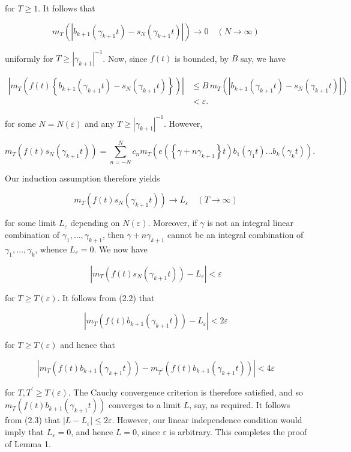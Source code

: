 \documentclass[10pt]{article}
\begin{document}
for $T \geq 1$. It follows that

$$
m_{T}\left(\left|b_{k+1}\left(\gamma_{k+1} t\right)-s_{N}\left(\gamma_{k+1} t\right)\right|\right) \rightarrow 0 \quad(N \rightarrow \infty)
$$

uniformly for $T \geq |\gamma_{k+1}|^{-1}$. Now, since $f(t)$ is bounded, by $B$ say, we have


\begin{align*}
\left|m_{T}\left(f(t)\left\{b_{k+1}\left(\gamma_{k+1}t\right)-s_{N}\left(\gamma_{k+1}t\right)\right\}\right)\right|
&\leq B\,m_{T}\left(\left|b_{k+1}\left(\gamma_{k+1}t\right)-s_{N}\left(\gamma_{k+1}t\right)\right|\right) \\
&<\varepsilon. \tag{2.2}
\end{align*}


for some $N=N(\varepsilon)$ and any $T \geq |\gamma_{k+1}|^{-1}$. However,

$$
m_{T}\left(f(t) s_{N}\left(\gamma_{k+1} t\right)\right)=\sum_{n=-N}^{N} c_{n} m_{T}\left(e\left(\left\{\gamma+n \gamma_{k+1}\right\} t\right) b_{1}\left(\gamma_{1} t\right) \ldots b_{k}\left(\gamma_{k} t\right)\right) .
$$

Our induction assumption therefore yields

$$
m_{T}\left(f(t) s_{N}\left(\gamma_{k+1} t\right)\right) \rightarrow L_{\varepsilon} \quad(T \rightarrow \infty)
$$

for some limit $L_{\varepsilon}$ depending on $N(\varepsilon)$. Moreover, if $\gamma$ is not an integral linear combination of $\gamma_{1}, \ldots, \gamma_{k+1}$, then $\gamma+n \gamma_{k+1}$ cannot be an integral combination of $\gamma_{1}, \ldots, \gamma_{k}$, whence $L_{\varepsilon}=0$. We now have

$$
\left|m_{T}\left(f(t) s_{N}\left(\gamma_{k+1} t\right)\right)-L_{\varepsilon}\right|<\varepsilon
$$

for $T \geq T(\varepsilon)$. It follows from (2.2) that


\begin{equation*}
\left|m_{T}\left(f(t) b_{k+1}\left(\gamma_{k+1} t\right)\right)-L_{\varepsilon}\right|<2 \varepsilon \tag{2.3}
\end{equation*}


for $T \geq T(\varepsilon)$ and hence that

$$
\left|m_{T}\left(f(t) b_{k+1}\left(\gamma_{k+1} t\right)\right)-m_{T^{\prime}}\left(f(t) b_{k+1}\left(\gamma_{k+1} t\right)\right)\right|<4 \varepsilon
$$

for $T, T^{\prime} \geq T(\varepsilon)$. The Cauchy convergence criterion is therefore satisfied, and so $m_{T}\left(f(t) b_{k+1}\left(\gamma_{k+1} t\right)\right)$ converges to a limit $L$, say, as required. It follows from (2.3) that $\left|L-L_{\varepsilon}\right| \leq 2 \varepsilon$. However, our linear independence condition would imply that $L_{\varepsilon}=0$, and hence $L=0$, since $\varepsilon$ is arbitrary. This completes the proof of Lemma 1.
\end{document}
